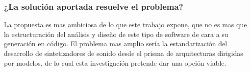 \subsubsection{¿La solución aportada resuelve el problema?}

La propuesta es mas ambiciosa de lo que este trabajo expone, que no es mas que la estructuración del análisis y diseño de este tipo de software de cara a su generación en código. El problema mas amplio sería la estandarización del desarrollo de sintetizadores de sonido desde el prisma de arquitecturas dirigidas por modelos, de lo cual esta investigación pretende dar una opción viable. 
